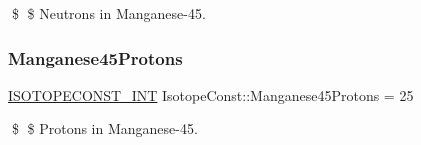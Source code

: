 \$ \$ Neutrons in Manganese-\/45. \mbox{\label{group___isotope_const-_manganese-_mn45_ga1a4262b0dceb36dd33fd9ddde4ab7fd8}} 
\subsubsection{\texorpdfstring{Manganese45\+Protons}{Manganese45Protons}}
{\footnotesize\ttfamily \mbox{\hyperlink{group___isotope_const-_macros_ga5f18360b3e99483a35c32d789e62621c}{I\+S\+O\+T\+O\+P\+E\+C\+O\+N\+S\+T\+\_\+\+I\+NT}} Isotope\+Const\+::\+Manganese45\+Protons = 25}

\$ \$ Protons in Manganese-\/45. 